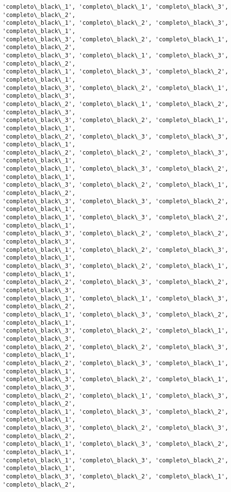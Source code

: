 \documentclass[11pt]{article}
\begin{document}
\begin{Verbatim}[commandchars=\\\{\}]
'completo\_black\_1', 'completo\_black\_1', 'completo\_black\_3', 'completo\_black\_2',
'completo\_black\_1', 'completo\_black\_2', 'completo\_black\_3', 'completo\_black\_1',
'completo\_black\_3', 'completo\_black\_2', 'completo\_black\_1', 'completo\_black\_2',
'completo\_black\_3', 'completo\_black\_1', 'completo\_black\_3', 'completo\_black\_2',
'completo\_black\_1', 'completo\_black\_3', 'completo\_black\_2', 'completo\_black\_1',
'completo\_black\_3', 'completo\_black\_2', 'completo\_black\_1', 'completo\_black\_3',
'completo\_black\_2', 'completo\_black\_1', 'completo\_black\_2', 'completo\_black\_3',
'completo\_black\_3', 'completo\_black\_2', 'completo\_black\_1', 'completo\_black\_1',
'completo\_black\_2', 'completo\_black\_3', 'completo\_black\_3', 'completo\_black\_1',
'completo\_black\_2', 'completo\_black\_2', 'completo\_black\_3', 'completo\_black\_1',
'completo\_black\_1', 'completo\_black\_3', 'completo\_black\_2', 'completo\_black\_1',
'completo\_black\_3', 'completo\_black\_2', 'completo\_black\_1', 'completo\_black\_2',
'completo\_black\_3', 'completo\_black\_3', 'completo\_black\_2', 'completo\_black\_1',
'completo\_black\_1', 'completo\_black\_3', 'completo\_black\_2', 'completo\_black\_1',
'completo\_black\_3', 'completo\_black\_2', 'completo\_black\_2', 'completo\_black\_3',
'completo\_black\_1', 'completo\_black\_2', 'completo\_black\_3', 'completo\_black\_1',
'completo\_black\_3', 'completo\_black\_2', 'completo\_black\_1', 'completo\_black\_1',
'completo\_black\_2', 'completo\_black\_3', 'completo\_black\_2', 'completo\_black\_3',
'completo\_black\_1', 'completo\_black\_1', 'completo\_black\_3', 'completo\_black\_2',
'completo\_black\_1', 'completo\_black\_3', 'completo\_black\_2', 'completo\_black\_1',
'completo\_black\_3', 'completo\_black\_2', 'completo\_black\_1', 'completo\_black\_3',
'completo\_black\_2', 'completo\_black\_2', 'completo\_black\_3', 'completo\_black\_1',
'completo\_black\_2', 'completo\_black\_3', 'completo\_black\_1', 'completo\_black\_1',
'completo\_black\_3', 'completo\_black\_2', 'completo\_black\_1', 'completo\_black\_3',
'completo\_black\_2', 'completo\_black\_1', 'completo\_black\_3', 'completo\_black\_2',
'completo\_black\_1', 'completo\_black\_3', 'completo\_black\_2', 'completo\_black\_1',
'completo\_black\_3', 'completo\_black\_2', 'completo\_black\_3', 'completo\_black\_2',
'completo\_black\_1', 'completo\_black\_3', 'completo\_black\_2', 'completo\_black\_1',
'completo\_black\_1', 'completo\_black\_3', 'completo\_black\_2', 'completo\_black\_1',
'completo\_black\_3', 'completo\_black\_2', 'completo\_black\_1', 'completo\_black\_2',

\end{Verbatim}
\end{document}
